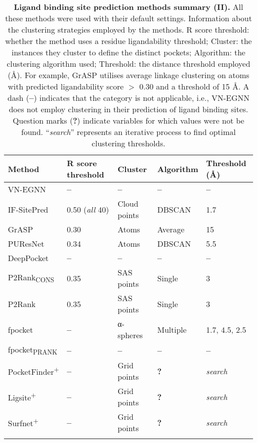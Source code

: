 \begin{landscape}
\begin{longtable}{|M{35mm}|M{45mm}|M{35mm}|M{35mm}|M{35mm}|}
\hline
\textbf{Method} & \textbf{R score threshold}  & \textbf{Cluster} & \textbf{Algorithm}   & \textbf{Threshold} (\AA{})\\ \hline
\endfirsthead
%
\endhead
%
VN-EGNN       & \textbf{--}                 & \textbf{--}            & \textbf{--}         & \textbf{--}         \\ \hline
IF-SitePred   & 0.50 (\textit{all} 40)      & Cloud points & DBSCAN    & 1.7       \\ \hline
GrASP         & 0.30               & Atoms        & Average   & 15        \\ \hline
PUResNet      & 0.34              & Atoms        & DBSCAN    & 5.5       \\ \hline
DeepPocket    & \textbf{--}                 & \textbf{--}            & \textbf{--}         & \textbf{--}         \\ \hline
P2Rank\textsubscript{CONS}    & 0.35              & SAS points   & Single    & 3         \\ \hline
P2Rank        & 0.35              & SAS points   & Single    & 3         \\ \hline
fpocket       & \textbf{--}                 & α-spheres   & Multiple  & 1.7, 4.5, 2.5         \\ \hline
fpocket\textsubscript{PRANK}       & \textbf{--}                 & \textbf{--}   & \textbf{--}  & \textbf{--}         \\ \hline
PocketFinder\textsuperscript{+} & \textbf{--}                 & Grid points            & \textbf{?}         & \textit{search}         \\ \hline
Ligsite\textsuperscript{+}      & \textbf{--}                 & Grid points            & \textbf{?}         & \textit{search} \\ \hline
Surfnet\textsuperscript{+}      & \textbf{--}                 & Grid points            & \textbf{?}         & \textit{search}      \\ \hline
\caption[Ligand binding site prediction methods summary (II)]{\textbf{Ligand binding site prediction methods summary (II).} All these methods were used with their default settings. Information about the clustering strategies employed by the methods. R score threshold: whether the method uses a residue ligandability threshold; Cluster: the instances they cluster to define the distinct pockets; Algorithm: the clustering algorithm used; Threshold: the distance threshold employed (\AA{}). For example, GrASP utilises average linkage clustering on atoms with predicted ligandability score $>$ 0.30 and a threshold of 15 \AA{}. A dash (\textbf{--}) indicates that the category is not applicable, i.e., VN-EGNN does not employ clustering in their prediction of ligand binding sites. Question marks (\textbf{?}) indicate variables for which values were not be found. ``\textit{search}'' represents an iterative process to find optimal clustering thresholds.}
\label{tab:methods_details_2}\\
\end{longtable}
\end{landscape}

